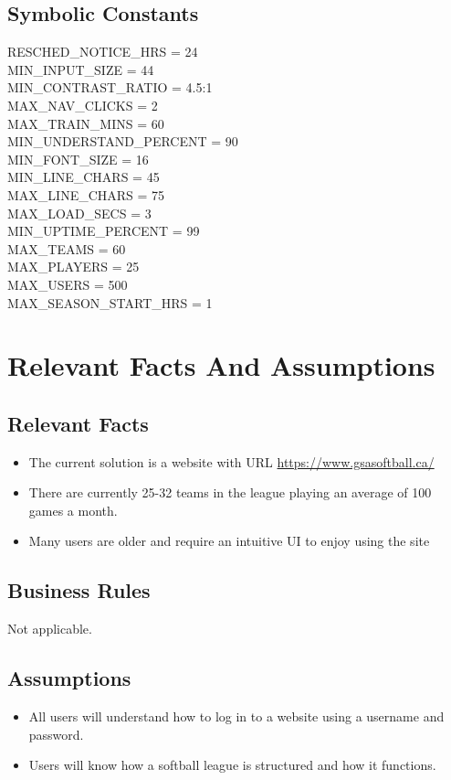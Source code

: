 \documentclass[12pt]{article}
\begin{document}
\subsection{Symbolic Constants}
RESCHED\_NOTICE\_HRS = 24\\
MIN\_INPUT\_SIZE = 44\\
MIN\_CONTRAST\_RATIO = 4.5:1\\
MAX\_NAV\_CLICKS = 2\\
MAX\_TRAIN\_MINS = 60\\
MIN\_UNDERSTAND\_PERCENT = 90\\
MIN\_FONT\_SIZE = 16\\
MIN\_LINE\_CHARS = 45\\
MAX\_LINE\_CHARS = 75\\
MAX\_LOAD\_SECS = 3\\
MIN\_UPTIME\_PERCENT = 99\\
MAX\_TEAMS = 60\\
MAX\_PLAYERS = 25\\
MAX\_USERS = 500\\
MAX\_SEASON\_START\_HRS = 1\\

\section{Relevant Facts And Assumptions}
\subsection{Relevant Facts}
\begin{itemize}
  \item The current solution is a website with URL 
  \url{https://www.gsasoftball.ca/}
  \item There are currently 25-32 teams in the league playing an average of
  100 games a month.
  \item Many users are older and require an intuitive UI to enjoy using the
  site
\end{itemize}

\subsection{Business Rules}
Not applicable.

\subsection{Assumptions}
\begin{itemize}
  \item All users will understand how to log in to a website using a username
  and password.
  \item Users will know how a softball league is structured and how it functions.
\end{itemize}
\end{document}

